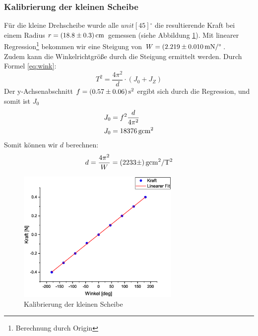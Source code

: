 \subsubsection{Kalibrierung der kleinen Scheibe}
Für die kleine Drehscheibe wurde alle $unit[45]{^\circ}$ die resultierende Kraft bei einem Radius $r = \unit[(18.8 \pm 0.3)]{cm}$ gemessen (siehe Abbildung \ref{fig:kal1}). Mit linearer Regression\footnote{Berechnung durch Origin} bekommen wir eine Steigung von $W = \unit[(2.219 \pm 0.010]{mN/^\circ}$.\\
Zudem kann die Winkelrichtgröße durch die Steigung ermittelt werden. Durch Formel \ref{eq:wink}:
\begin{equation}
T^2 = \frac{4\pi^2}{d}\cdot (J_0+J_Z)
\end{equation}
Der y-Achsenabschnitt $f = \unit[(0.57 \pm 0.06)]{s^2}$ ergibt sich durch die Regression, und somit ist $J_0$
\begin{align}
J_0 &= f^2\frac{d}{4\pi^2}\\
J_0 &= \unit[18376]{g cm^2}
\end{align}
Somit können wir $d$ berechnen:
\begin{equation*}
d = \frac{4\pi^2}{W} = \unit[(2233 \pm  )]{g cm^2/T^2}
\end{equation*}


\begin{figure}
\begin{center}
\includegraphics[width=0.7\textwidth]{Bilder/kal1.eps}
\caption{Kalibrierung der kleinen Scheibe}
\label{fig:kal1}
\end{center}
\end{figure}
